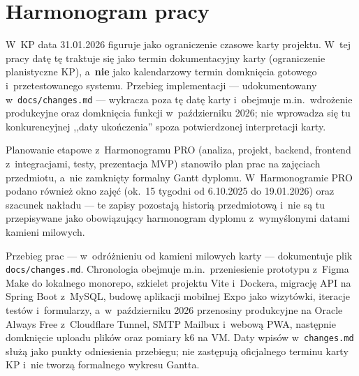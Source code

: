 \documentclass{sprz}
\begin{document}
\section{Harmonogram pracy}

W~KP data 31.01.2026 figuruje jako ograniczenie czasowe karty projektu. W~tej pracy datę tę traktuje się jako termin dokumentacyjny karty (ograniczenie planistyczne KP), a~\textbf{nie} jako kalendarzowy termin domknięcia gotowego i~przetestowanego systemu. Przebieg implementacji --- udokumentowany w~\texttt{docs/\allowbreak changes.md} --- wykracza poza tę datę karty i~obejmuje m.in.\ wdrożenie produkcyjne oraz domknięcia funkcji w~październiku 2026; nie wprowadza się tu konkurencyjnej ,,daty ukończenia'' spoza potwierdzonej interpretacji karty.

Planowanie etapowe z~Harmonogramu PRO (analiza, projekt, backend, frontend z~integracjami, testy, prezentacja MVP) stanowiło plan prac na zajęciach przedmiotu, a~nie zamknięty formalny Gantt dyplomu. W~Harmonogramie PRO podano również okno zajęć (ok.\ 15 tygodni od 6.10.2025 do 19.01.2026) oraz szacunek nakładu --- te zapisy pozostają historią przedmiotową i~nie są tu przepisywane jako obowiązujący harmonogram dyplomu z~wymyślonymi datami kamieni milowych.

Przebieg prac --- w~odróżnieniu od kamieni milowych karty --- dokumentuje plik \texttt{docs/\allowbreak changes.md}. Chronologia obejmuje m.in.\ przeniesienie prototypu z~Figma Make do lokalnego monorepo, szkielet projektu Vite i~Dockera, migrację API na Spring Boot z~MySQL, budowę aplikacji mobilnej Expo jako wizytówki, iteracje testów i~formularzy, a~w~październiku 2026 przenosiny produkcyjne na Oracle Always Free z~Cloudflare Tunnel, SMTP Mailbux i~webową PWA, następnie domknięcie uploadu plików oraz pomiary k6 na VM. Daty wpisów w~\texttt{changes.md} służą jako punkty odniesienia przebiegu; nie zastępują oficjalnego terminu karty KP i~nie tworzą formalnego wykresu Gantta.
\end{document}
